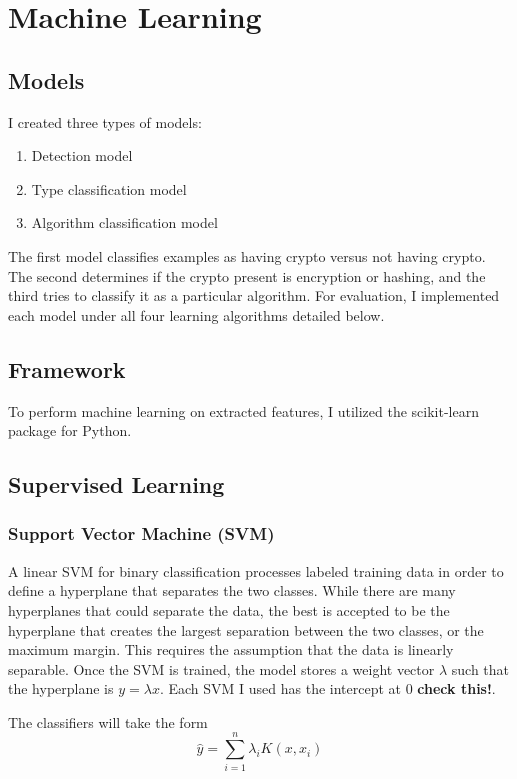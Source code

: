 \chapter{Machine Learning}

\section{Models}

I created three types of models:
\begin{enumerate}
	\item Detection model
	\item Type classification model
	\item Algorithm classification model
\end{enumerate}

The first model classifies examples as having crypto versus not having crypto.  The second determines if the crypto present is encryption or hashing, and the third tries to classify it as a particular algorithm.  For evaluation, I implemented each model under all four learning algorithms detailed below.

\section{Framework}

To perform machine learning on extracted features, I utilized the scikit-learn\cite{scikit-learn} package for Python.

\section{Supervised Learning}
\subsection{Support Vector Machine (SVM)}
A linear SVM for binary classification processes labeled training data in order to define a hyperplane that separates the two classes.  While there are many hyperplanes that could separate the data, the best is accepted to be the hyperplane that creates the largest separation between the two classes, or the maximum margin.  This requires the assumption that the data is linearly separable.  Once the SVM is trained, the model stores a weight vector $\lambda$ such that the hyperplane is $y = \lambda x$.  Each SVM I used has the intercept at 0 \textbf{check this!}.

The classifiers will take the form
\begin{equation}
	\hat{y} = \sum_{i=1}^n \lambda_i K(x, x_i) \label{svm}
\end{equation}

